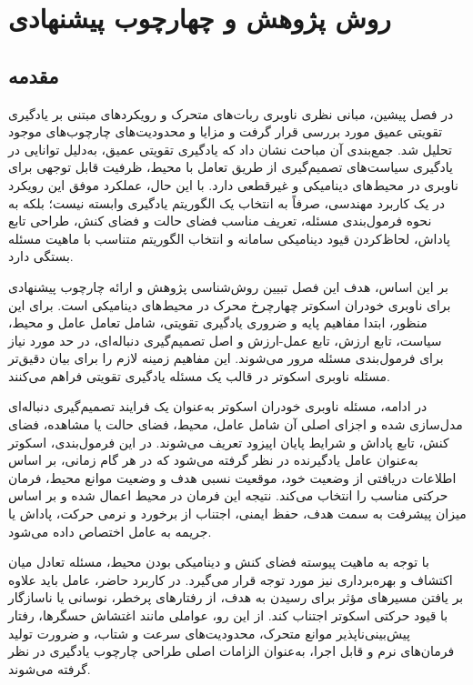 \chapter{روش پژوهش و چهارچوب پیشنهادی}

\section{مقدمه}

در فصل پیشین، مبانی نظری ناوبری ربات‌های متحرک و رویکردهای مبتنی بر یادگیری تقویتی عمیق مورد بررسی قرار گرفت و مزایا و محدودیت‌های چارچوب‌های موجود تحلیل شد. جمع‌بندی آن مباحث نشان داد که یادگیری تقویتی عمیق، به‌دلیل توانایی در یادگیری سیاست‌های تصمیم‌گیری از طریق تعامل با محیط، ظرفیت قابل توجهی برای ناوبری در محیط‌های دینامیکی و غیرقطعی دارد. با این حال، عملکرد موفق این رویکرد در یک کاربرد مهندسی، صرفاً به انتخاب یک الگوریتم یادگیری وابسته نیست؛ بلکه به نحوه فرمول‌بندی مسئله، تعریف مناسب فضای حالت و فضای کنش، طراحی تابع پاداش، لحاظ‌کردن قیود دینامیکی سامانه و انتخاب الگوریتم متناسب با ماهیت مسئله بستگی دارد.

بر این اساس، هدف این فصل تبیین روش‌شناسی پژوهش و ارائه چارچوب پیشنهادی برای ناوبری خودران اسکوتر چهارچرخ محرک در محیط‌های دینامیکی است. برای این منظور، ابتدا مفاهیم پایه و ضروری یادگیری تقویتی، شامل تعامل عامل و محیط، سیاست، تابع ارزش، تابع عمل-ارزش و اصل تصمیم‌گیری دنباله‌ای، در حد مورد نیاز برای فرمول‌بندی مسئله مرور می‌شوند. این مفاهیم زمینه لازم را برای بیان دقیق‌تر مسئله ناوبری اسکوتر در قالب یک مسئله یادگیری تقویتی فراهم می‌کنند.

در ادامه، مسئله ناوبری خودران اسکوتر به‌عنوان یک فرایند تصمیم‌گیری دنباله‌ای مدل‌سازی شده و اجزای اصلی آن شامل عامل، محیط، فضای حالت یا مشاهده، فضای کنش، تابع پاداش و شرایط پایان اپیزود تعریف می‌شوند. در این فرمول‌بندی، اسکوتر به‌عنوان عامل یادگیرنده در نظر گرفته می‌شود که در هر گام زمانی، بر اساس اطلاعات دریافتی از وضعیت خود، موقعیت نسبی هدف و وضعیت موانع محیط، فرمان حرکتی مناسب را انتخاب می‌کند. نتیجه این فرمان در محیط اعمال شده و بر اساس میزان پیشرفت به سمت هدف، حفظ ایمنی، اجتناب از برخورد و نرمی حرکت، پاداش یا جریمه به عامل اختصاص داده می‌شود.

با توجه به ماهیت پیوسته فضای کنش و دینامیکی بودن محیط، مسئله تعادل میان اکتشاف و بهره‌برداری نیز مورد توجه قرار می‌گیرد. در کاربرد حاضر، عامل باید علاوه بر یافتن مسیرهای مؤثر برای رسیدن به هدف، از رفتارهای پرخطر، نوسانی یا ناسازگار با قیود حرکتی اسکوتر اجتناب کند. از این رو، عواملی مانند اغتشاش حسگرها، رفتار پیش‌بینی‌ناپذیر موانع متحرک، محدودیت‌های سرعت و شتاب، و ضرورت تولید فرمان‌های نرم و قابل اجرا، به‌عنوان الزامات اصلی طراحی چارچوب یادگیری در نظر گرفته می‌شوند.

